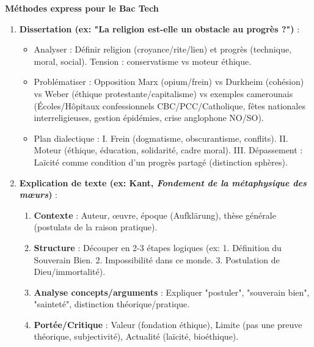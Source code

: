 \documentclass[11pt]{article}
\newcommand{\cle}[1]{{\popxbold\color{popdark}#1}}
\begin{document}
\begin{aretenir}
\textbf{Méthodes express pour le Bac Tech}
\begin{enumerate}
    \item \textbf{Dissertation (ex: "La religion est-elle un obstacle au progrès ?")} :
    \begin{itemize}
        \item Analyser : Définir \cle{religion} (croyance/rite/lien) et \cle{progrès} (technique, moral, social). Tension : conservatisme vs moteur éthique.
        \item Problématiser : Opposition Marx (opium/frein) vs Durkheim (cohésion) vs Weber (éthique protestante/capitalisme) vs exemples camerounais (Écoles/Hôpitaux confessionnels CBC/PCC/Catholique, fêtes nationales interreligieuses, gestion épidémies, crise anglophone NO/SO).
        \item Plan dialectique : I. Frein (dogmatisme, obscurantisme, conflits). II. Moteur (éthique, éducation, solidarité, cadre moral). III. Dépassement : Laïcité comme condition d'un progrès partagé (distinction sphères).
    \end{itemize}
    \item \textbf{Explication de texte (ex: Kant, \emph{Fondement de la métaphysique des mœurs})} :
    \begin{enumerate}
        \item \textbf{Contexte} : Auteur, œuvre, époque (Aufklärung), thèse générale (postulats de la raison pratique).
        \item \textbf{Structure} : Découper en 2-3 étapes logiques (ex: 1. Définition du Souverain Bien. 2. Impossibilité dans ce monde. 3. Postulation de Dieu/immortalité).
        \item \textbf{Analyse concepts/arguments} : Expliquer "postuler", "souverain bien", "sainteté", distinction théorique/pratique.
        \item \textbf{Portée/Critique} : Valeur (fondation éthique), Limite (pas une preuve théorique, subjectivité), Actualité (laïcité, bioéthique).
    \end{enumerate}
\end{enumerate}

\end{aretenir}
\end{document}
